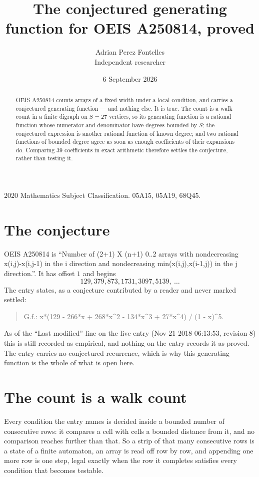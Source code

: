 \documentclass[11pt,a4paper]{article}
\title{The conjectured generating function for OEIS A250814, proved}
\author{Adrian Perez Fontelles\\ \small Independent researcher}
\date{6 September 2026}
\theoremstyle{plain}
\theoremstyle{definition}
\begin{document}
\maketitle

\begin{abstract}
OEIS A250814 counts arrays of a fixed width under a local condition, and carries a conjectured
generating function --- and nothing else. It is true. The count is a walk count in a finite
digraph on $S=27$ vertices, so its generating function is a rational function whose numerator
and denominator have degrees bounded by $S$; the conjectured expression is another rational
function of known degree; and two rational functions of bounded degree agree as soon as enough
coefficients of their expansions do. Comparing $39$ coefficients in exact arithmetic
therefore settles the conjecture, rather than testing it.
\end{abstract}

\noindent\small 2020 Mathematics Subject Classification. 05A15, 05A19, 68Q45.\normalsize

\section{The conjecture}

OEIS A250814 is ``Number of (2+1) X (n+1) 0..2 arrays with nondecreasing x(i,j)-x(i,j-1) in the i direction and nondecreasing min(x(i,j),x(i-1,j)) in the j direction.''. It has offset $1$ and begins
\[
129, 379, 873, 1731, 3097, 5139,\ \dots
\]
The entry states, as a conjecture contributed by a reader and never marked settled:
\begin{quote}
G.f.: x*(129 - 266*x + 268*x\^{}2 - 134*x\^{}3 + 27*x\^{}4) / (1 - x)\^{}5.
\end{quote}
As of the ``Last modified'' line on the live entry (Nov 21 2018 06:13:53, revision 8) this is still
recorded as empirical, and nothing on the entry records it as proved. The entry carries no
conjectured recurrence, which is why this generating function is the whole of what is open
here.

\section{The count is a walk count}

Every condition the entry names is decided inside a bounded number of consecutive rows: it
compares a cell with cells a bounded distance from it, and no comparison reaches further than
that. So a strip of that many consecutive rows is a state of a finite automaton, an array is
read off row by row, and appending one more row is one step, legal exactly when the row it
completes satisfies every condition that becomes testable.
\end{document}
